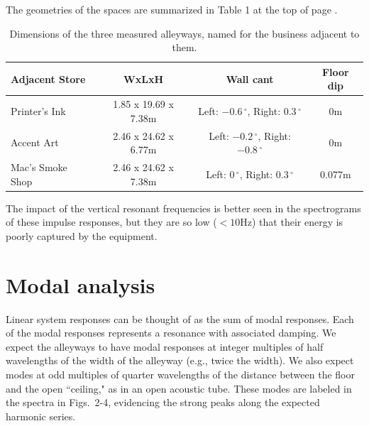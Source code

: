 \documentclass{aes137}
\renewcommand{\deg}{\,^{\circ}}
\begin{document}
The geometries of the spaces are summarized in Table 1 at the top of page
\pageref{table:geometries}. 

\begin{table}
\begin{center} 
\begin{tabular}{|l|c|c|c|}
\hline
\textbf{Adjacent Store} & \textbf{WxLxH} & \textbf{Wall cant} & \textbf{Floor dip} \\
\hline
Printer's Ink & 1.85 x 19.69 x 7.38m & Left: $-0.6\deg$, Right: $0.3\deg$ & 0m \\
\hline
Accent Art & 2.46 x 24.62 x 6.77m & Left: $-0.2\deg$, Right: $-0.8\deg$ & 0m \\
\hline
Mac's Smoke Shop & 2.46 x 24.62 x 7.38m & Left: $0\deg$, Right: $0.3\deg$ & 0.077m \\
\hline
\end{tabular} \caption{Dimensions of the three measured alleyways, named for the business adjacent to them.}
\end{center}
\label{table:geometries}
\end{table}

	
The impact of the vertical resonant frequencies is better seen in the spectrograms of these impulse responses, but they are so low ($<10$Hz) that their energy is poorly captured by the equipment. %


\section{Modal analysis}

Linear system responses can be thought of as the sum of modal responses. Each of the modal responses represents a resonance with associated damping. We expect the alleyways to have modal responses at integer multiples of half wavelengths of the width of the alleyway (e.g., twice the width). We also expect modes at odd multiples of quarter wavelengths of the distance between the floor and the open ``ceiling," as in an open acoustic tube. These modes are labeled in the spectra in Figs.~2-4, evidencing the strong peaks along the expected harmonic series.


\end{document}
